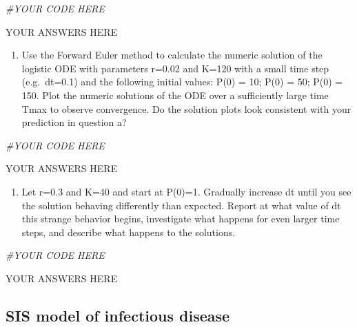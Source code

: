 \documentclass[
]{book}
\newenvironment{Shaded}{\begin{snugshade}}{\end{snugshade}}
\newcommand{\CommentTok}[1]{\textcolor[rgb]{0.56,0.35,0.01}{\textit{#1}}}
\providecommand{\tightlist}{%
  \setlength{\itemsep}{0pt}\setlength{\parskip}{0pt}}
\theoremstyle{definition}
\theoremstyle{definition}
\theoremstyle{definition}
\theoremstyle{remark}
\begin{document}
\begin{Shaded}
\begin{Highlighting}[]
\CommentTok{\#YOUR CODE HERE}
\end{Highlighting}
\end{Shaded}

YOUR ANSWERS HERE

\begin{enumerate}
\def\labelenumi{\alph{enumi})}
\setcounter{enumi}{1}
\tightlist
\item
  Use the Forward Euler method to calculate the numeric solution of the logistic ODE with parameters r=0.02 and K=120 with a small time step (e.g.~dt=0.1) and the following initial values: P(0) = 10; P(0) = 50; P(0) = 150. Plot the numeric solutions of the ODE over a sufficiently large time Tmax to observe convergence. Do the solution plots look consistent with your prediction in question a?
\end{enumerate}

\begin{Shaded}
\begin{Highlighting}[]
\CommentTok{\#YOUR CODE HERE}
\end{Highlighting}
\end{Shaded}

YOUR ANSWERS HERE

\begin{enumerate}
\def\labelenumi{\arabic{enumi}.}
\setcounter{enumi}{2}
\tightlist
\item
  Let r=0.3 and K=40 and start at P(0)=1. Gradually increase dt until you see the solution behaving differently than expected. Report at what value of dt this strange behavior begins, investigate what happens for even larger time steps, and describe what happens to the solutions.
\end{enumerate}

\begin{Shaded}
\begin{Highlighting}[]
\CommentTok{\#YOUR CODE HERE}
\end{Highlighting}
\end{Shaded}

YOUR ANSWERS HERE

\hypertarget{sis-model-of-infectious-disease}{%
\subsection{SIS model of infectious disease}\label{sis-model-of-infectious-disease}}
\end{document}
